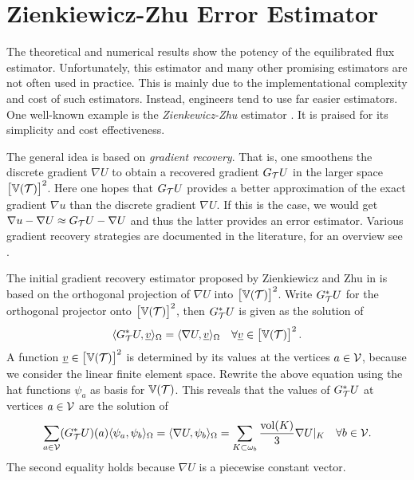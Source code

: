 \documentclass[thesis.tex]{subfiles}
\begin{document}
\section{Zienkiewicz-Zhu Error Estimator}
The theoretical and numerical results show the potency of the equilibrated flux estimator. Unfortunately, this estimator and many other promising
estimators are not often used in practice. This is mainly due to the implementational complexity and cost of such estimators.
Instead, engineers tend to use far easier estimators. One well-known example is the \emph{Zienkewicz-Zhu} estimator 
\cite{zienkiewicz1987simple, zienkiewicz1992superconvergent}. It is praised for its simplicity and cost effectiveness.

The general idea is based on \emph{gradient recovery}. That is, one smoothens the discrete gradient $\nabla U$ to obtain a
recovered gradient $G_{\mathcal{T}} U$ in the larger space $\left[\mathbb{V}(\mathcal{T})\right]^2$. Here
one hopes that $G_{\mathcal{T}} U$ provides a better approximation of the exact gradient $\nabla u$ than the discrete gradient $\nabla U$.
If this is the case, we would get $\nabla u - \nabla U \approx G_{\mathcal{T}} U - \nabla U$ and thus the latter provides
an error estimator.  
Various gradient recovery strategies are documented in the literature, for an overview see \cite{zienkiewicz1992superconvergent}. 

The initial gradient recovery estimator proposed by Zienkiewicz and Zhu in \cite{zienkiewicz1987simple} is based on
the orthogonal projection of $\nabla U$ into $\left[\mathbb{V}(\mathcal{T})\right]^2$. Write $G_{\mathcal{T}}^*U$ for the orthogonal
projector onto $\left[\mathbb{V}(\mathcal{T})\right]^2$, then $G_{\mathcal{T}}^*U$ is given as the solution of
\[
  \langle G_{\mathcal{T}}^*U, \underline{v}  \rangle_\Omega = \langle \nabla U,\underline{v} \rangle_\Omega \quad \forall \underline{v} \in \left[\mathbb{V}(\mathcal{T})\right]^2.
\]
A function $\underline{v} \in \left[\mathbb{V}(\mathcal{T})\right]^2$ is determined by its values at the vertices $a \in \mathcal{V}$,
because we consider the linear finite element space. Rewrite the above equation using the hat functions $\psi_a$ as basis for $\mathbb{V}(\mathcal{T})$.
This reveals that the values of $G_{\mathcal{T}}^*U$ at vertices $a \in \mathcal{V}$  are the solution of 
\begin{equation}
  \label{eq:zzproject}
  \sum_{a \in \mathcal{V}} (G_{\mathcal{T}}^* U)(a) \langle \psi_a, \psi_b \rangle_\Omega = \langle \nabla U, \psi_b \rangle_{\Omega} = \sum_{K \subset \omega_b} \frac{\operatorname{vol}(K)}{3} \nabla U|_K \quad \forall b \in \mathcal{V}.
\end{equation}
The second equality holds because $\nabla U$ is a piecewise constant vector.
\end{document}
